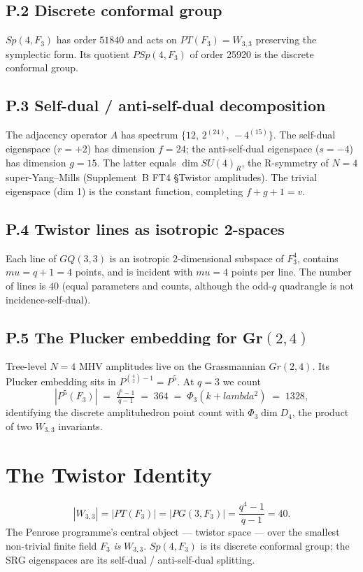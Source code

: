 \documentclass[12pt,a4paper]{article}
\def\mathbb#1{#1}%
\def\mathrm#1{#1}%
\def\mathcal#1{#1}%
\def\lambda{lambda}%
\def\mu{mu}%
\def\Phi#1{Phi#1}%
\def\cdot{ }%
\theoremstyle{definition}
\newcommand{\GQ}{\mathrm{GQ}}
\newcommand{\PG}{\mathrm{PG}}
\newcommand{\Sp}{\mathrm{Sp}}
\newcommand{\PSp}{\mathrm{PSp}}
\newcommand{\SU}{\mathrm{SU}}
\newcommand{\FF}{\mathbb{F}}
\begin{document}
\subsection*{P.2 \quad Discrete conformal group}
$\Sp(4,\FF_3)$ has order $51840$ and acts on $\mathbb{PT}(\FF_3) = W_{3,3}$
preserving the symplectic form. Its quotient
$\PSp(4,\FF_3)$ of order 25920 is the discrete conformal group.

\subsection*{P.3 \quad Self-dual / anti-self-dual decomposition}
The adjacency operator $A$ has spectrum $\{12,\,2^{(24)},\,-4^{(15)}\}$.
The self-dual eigenspace ($r=+2$) has dimension $f=24$; the anti-self-dual
eigenspace ($s=-4$) has dimension $g=15$. The latter equals
$\dim\SU(4)_R$, the R-symmetry of $\mathcal{N}=4$ super-Yang--Mills
(Supplement~B FT4 §Twistor amplitudes). The trivial eigenspace (dim 1)
is the constant function, completing $f+g+1=v$.

\subsection*{P.4 \quad Twistor lines as isotropic 2-spaces}
Each line of $\GQ(3,3)$ is an isotropic 2-dimensional subspace of
$\FF_3^4$, contains $\mu=q+1=4$ points, and is incident with $\mu=4$
points per line. The number of lines is $40$ (equal parameters and
counts, although the odd-$q$ quadrangle is not incidence-self-dual).

\subsection*{P.5 \quad The Plucker embedding for Gr$(2,4)$}
Tree-level $\mathcal{N}=4$ MHV amplitudes live on the Grassmannian
$\mathrm{Gr}(2,4)$. Its Plucker embedding sits in $\mathbb{P}^{\binom{4}{2}-1} = \mathbb{P}^5$.
At $q=3$ we count
\[
|\mathbb{P}^5(\FF_3)| \;=\; \tfrac{q^6-1}{q-1} \;=\; 364 \;=\; \Phi_3\cdot(k+\lambda^2) \;=\; 13\cdot 28,
\]
identifying the discrete amplituhedron point count with
$\Phi_3\cdot\dim D_4$, the product of two $W_{3,3}$ invariants.

\section*{The Twistor Identity}
\[
\boxed{\;|W_{3,3}|=|\mathbb{PT}(\FF_3)|=|\PG(3,\FF_3)|=\frac{q^4-1}{q-1}=40.\;}
\]
The Penrose programme's central object — twistor space — over the
smallest non-trivial finite field $\FF_3$ \emph{is} $W_{3,3}$.
$\Sp(4,\FF_3)$ is its discrete conformal group; the SRG eigenspaces are
its self-dual / anti-self-dual splitting.
\end{document}
